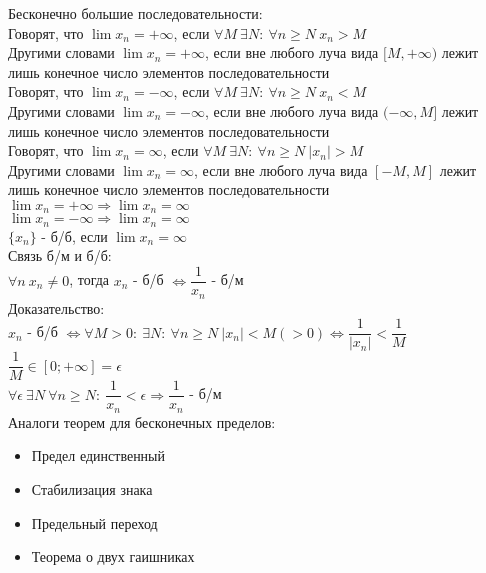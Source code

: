 \documentclass[12pt]{article}
\begin{document}
Бесконечно большие последовательности:\\
Говорят, что $\lim x_n = +\infty$, если $\forall M\ \exists N:\ \forall n \ge N\ x_n > M$\\
Другими словами $\lim x_n = +\infty$, если вне любого луча вида $[M, +\infty)$ лежит лишь конечное число элементов последовательности\\

Говорят, что $\lim x_n = -\infty$, если $\forall M\ \exists N:\ \forall n \ge N\ x_n < M$\\
Другими словами $\lim x_n = -\infty$, если вне любого луча вида $(-\infty, M]$ лежит лишь конечное число элементов последовательности\\

Говорят, что $\lim x_n = \infty$, если $\forall M\ \exists N:\ \forall n \ge N\ |x_n| > M$\\
Другими словами $\lim x_n = \infty$, если вне любого луча вида $[-M, M]$ лежит лишь конечное число элементов последовательности\\

$\lim x_n = +\infty \Rightarrow \lim x_n = \infty$\\
$\lim x_n = -\infty \Rightarrow \lim x_n = \infty$\\

$\{x_n\}$ - б/б, если $\lim x_n = \infty$\\
Связь б/м и б/б:\\
$\forall n\ x_n \ne 0$, тогда $x_n$ - б/б $\Leftrightarrow \dfrac{1}{x_n}$ - б/м\\
Доказательство:\\
$x_n$ - б/б $\Leftrightarrow \forall M > 0:\ \exists N:\ \forall n \ge N\ |x_n| < M (> 0) \Leftrightarrow \dfrac{1}{|x_n|} < \dfrac{1}{M}$\\
$\dfrac{1}{M} \in [0; +\infty] = \epsilon$\\
$\forall \epsilon\ \exists N\ \forall n \ge N:\ \dfrac{1}{x_n} < \epsilon \Rightarrow \dfrac{1}{x_n}$ - б/м\\

Аналоги теорем для бесконечных пределов:
\begin{itemize}
    \item Предел единственный
    \item Стабилизация знака
    \item Предельный переход
    \item Теорема о двух гаишниках
\end{itemize}
\end{document}
